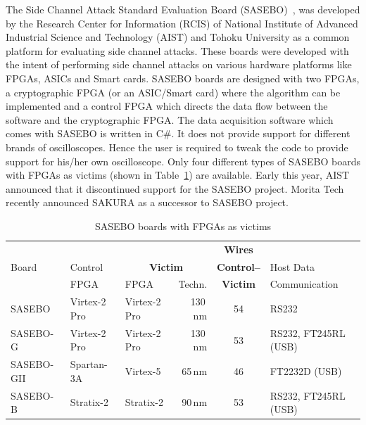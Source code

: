 \documentclass{llncs}
\numberwithin{algorithm}{chapter}
\begin{document}
The Side Channel Attack Standard Evaluation Board (SASEBO)~\cite{1516},\cite{1517} was developed by
the Research Center for Information (RCIS) of National Institute of Advanced Industrial
Science and Technology (AIST) and Tohoku University as a common platform for evaluating
side channel attacks. These boards were developed with the intent of performing side
channel attacks on various hardware platforms like FPGAs, ASICs and Smart cards.
SASEBO boards are designed with two FPGAs, a cryptographic FPGA (or an ASIC/Smart card) 
where the algorithm can be implemented and a control FPGA which directs the data flow between
the software and the cryptographic FPGA. The data acquisition software which comes with SASEBO is
written in C\#. It does not provide support for different brands of oscilloscopes.
Hence the user is required to tweak the code to provide support for his/her own oscilloscope.
Only four different types of SASEBO boards with FPGAs as victims (shown in Table~\ref{tab:sasebo})
are available. Early this year, AIST announced that it discontinued support for the SASEBO project. 
Morita Tech~\cite{2054} recently announced SAKURA as a successor to SASEBO project.

\begin{table}[t]%
  \centering%
  \caption{SASEBO boards with FPGAs as victims}%
  \label{tab:sasebo}%
  \begin{tabular}{|l|l|l|r|c|l|}\hline
             &                   & \multicolumn{2}{|c|}{~}                 & \textbf{Wires} &                    \\
  {Board} & {{Control}} & \multicolumn{2}{|c|}{\textbf{{Victim}}}& \textbf{Control--}   & {{Host Data}}     \\ 
             & {{FPGA}}    & {{FPGA}} & {{Techn.}} & \textbf{Victim}      & {{Communication}} \\ \hline
  SASEBO     & Virtex-2 Pro & Virtex-2 Pro &  130\,nm          & 54          & RS232 \\
  SASEBO-G   & Virtex-2 Pro & Virtex-2 Pro &  130\,nm          & 53          & RS232, FT245RL (USB)\\
  SASEBO-GII & Spartan-3A   & Virtex-5     &  65\,nm           & 46          & FT2232D (USB)\\
  SASEBO-B   & Stratix-2    & Stratix-2    &  90\,nm           & 53          & RS232, FT245RL (USB) \\ \hline %
  \end{tabular}%
  \vspace{-2ex}%
\end{table}
\end{document}
